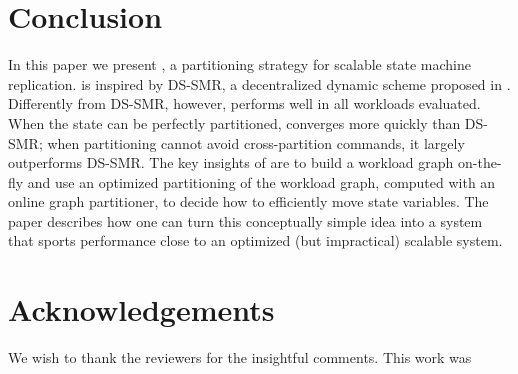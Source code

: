 \section{Conclusion}
\label{sec:conclusion}

In this paper we present \dynastar, a partitioning strategy for scalable state machine replication.
\dynastar is inspired by DS-SMR, a decentralized dynamic scheme proposed in \cite{hoang2016}.
Differently from DS-SMR, however, \dynastar performs well in all workloads evaluated.
When the state can be perfectly partitioned, \dynastar converges more quickly than DS-SMR; when partitioning cannot avoid cross-partition commands, it largely outperforms DS-SMR.
The key insights of \dynastar are to build a workload graph on-the-fly and use an optimized partitioning of the workload graph, computed with an online graph partitioner, to decide how to efficiently move state variables.
The paper describes how one can turn this conceptually simple idea into a system that sports performance close to an optimized (but impractical) scalable system.

\section*{Acknowledgements}

We wish to thank the reviewers for the insightful comments.
This work was 